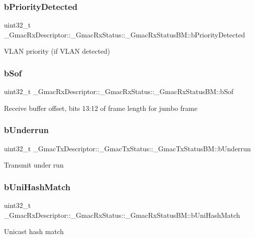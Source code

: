 \subsubsection{\texorpdfstring{bPriorityDetected}{bPriorityDetected}}
{\footnotesize\ttfamily uint32\+\_\+t \+\_\+\+Gmac\+Rx\+Descriptor\+::\+\_\+\+Gmac\+Rx\+Status\+::\+\_\+\+Gmac\+Rx\+Status\+B\+M\+::b\+Priority\+Detected}

V\+L\+AN priority (if V\+L\+AN detected) \mbox{\label{group__gmac__defines_ga7026ef3a4c69489e2698efc5887cfcd1}} 
\subsubsection{\texorpdfstring{bSof}{bSof}}
{\footnotesize\ttfamily uint32\+\_\+t \+\_\+\+Gmac\+Rx\+Descriptor\+::\+\_\+\+Gmac\+Rx\+Status\+::\+\_\+\+Gmac\+Rx\+Status\+B\+M\+::b\+Sof}

Receive buffer offset, bits 13\+:12 of frame length for jumbo frame \mbox{\label{group__gmac__defines_ga149c144aad6f6ba23b14b250a3570ff5}} 
\subsubsection{\texorpdfstring{bUnderrun}{bUnderrun}}
{\footnotesize\ttfamily uint32\+\_\+t \+\_\+\+Gmac\+Tx\+Descriptor\+::\+\_\+\+Gmac\+Tx\+Status\+::\+\_\+\+Gmac\+Tx\+Status\+B\+M\+::b\+Underrun}

Transmit under run \mbox{\label{group__gmac__defines_ga15f690063c4de67bb75d99a78ce9ed77}} 
\subsubsection{\texorpdfstring{bUniHashMatch}{bUniHashMatch}}
{\footnotesize\ttfamily uint32\+\_\+t \+\_\+\+Gmac\+Rx\+Descriptor\+::\+\_\+\+Gmac\+Rx\+Status\+::\+\_\+\+Gmac\+Rx\+Status\+B\+M\+::b\+Uni\+Hash\+Match}

Unicast hash match \mbox{\label{group__gmac__defines_gaf315ceadedbf98decc5af7f1e685fd8b}} 
